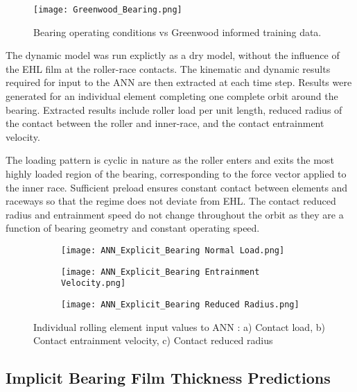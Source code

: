 \begin{figure}
	\centering  
	\texttt{[image: Greenwood\_Bearing.png]}
	\caption{Bearing operating conditions vs Greenwood informed training data.}
	\label{Greenwood_Bearing}
\end{figure} 


The dynamic model was run explictly as a dry model, without the influence of the EHL film at the roller-race contacts. The kinematic and dynamic results required for input to the ANN are then extracted at each time step. Results were generated for an individual element completing one complete orbit around the bearing. Extracted results include roller load per unit length, reduced radius of the contact between the roller and inner-race, and the contact entrainment velocity.

The loading pattern is cyclic in nature as the roller enters and exits the most highly loaded region of the bearing, corresponding to the force vector applied to the inner race. Sufficient preload ensures constant contact between elements and raceways so that the regime does not deviate from EHL. The contact reduced radius and entrainment speed do not change throughout the orbit as they are a function of bearing geometry and constant operating speed.

\begin{figure}
	\centering
	\begin{subfigure}[b]{0.9\textwidth}
		\centering
		\texttt{[image: ANN\_Explicit\_Bearing Normal Load.png]}
		\caption{}
		\label{Contact Normal Load ANN}
	\end{subfigure}
	\hfill
	\begin{subfigure}[b]{0.9\textwidth}
		\centering
		\texttt{[image: ANN\_Explicit\_Bearing Entrainment Velocity.png]}
		\caption{}
		\label{Contact Entrainment ANN}
	\end{subfigure}
	\hfill
	\begin{subfigure}[b]{0.9\textwidth}
		\centering
		\texttt{[image: ANN\_Explicit\_Bearing Reduced Radius.png]}
		\caption{}
		\label{Contact Reduced Radius ANN}
	\end{subfigure}
	\caption{Individual rolling element input values to ANN : a) Contact load, b) Contact entrainment velocity, c) Contact reduced radius}
	\label{Individual rolling element input values to ANN}
\end{figure}


\subsection{Implicit Bearing Film Thickness Predictions}

